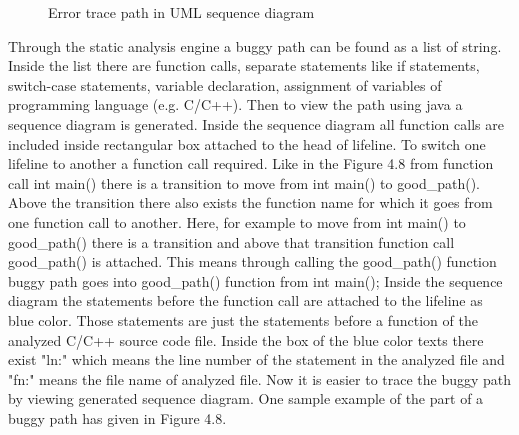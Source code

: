 \begin{figure}[htbp]
	\centering
	\label{figure:Error_trace_path}
	\caption{Error trace path in UML sequence diagram}
\end{figure}

Through the static analysis engine a buggy path can be found as a list of string. Inside the list there are function calls, separate statements like if statements, switch-case statements, variable declaration, assignment of variables of programming language (e.g. C/C++). Then to view the path using java a sequence diagram is generated. Inside the sequence diagram all function calls are included inside rectangular box attached to the head of lifeline. To switch one lifeline to another a function call required. Like in the Figure 4.8 from function call int main() there is a transition to move from int main() to good\_path(). Above the transition there also exists the function name for which it goes from one function call to another. Here, for example to move from int main() to good\_path() there is a transition and above that transition function call good\_path() is attached. This means through calling the good\_path() function buggy path goes into good\_path() function from int main(); Inside the sequence diagram the statements before the function call are attached to the lifeline as blue color. Those statements are just the statements before a function of the analyzed C/C++ source code file. Inside the box of the blue color texts there exist "ln:" which means the line number of the statement in the analyzed file and "fn:" means the file name of analyzed file. Now it is easier to trace the buggy path by viewing generated sequence diagram. One sample example of the part of a buggy path has given in Figure 4.8.



